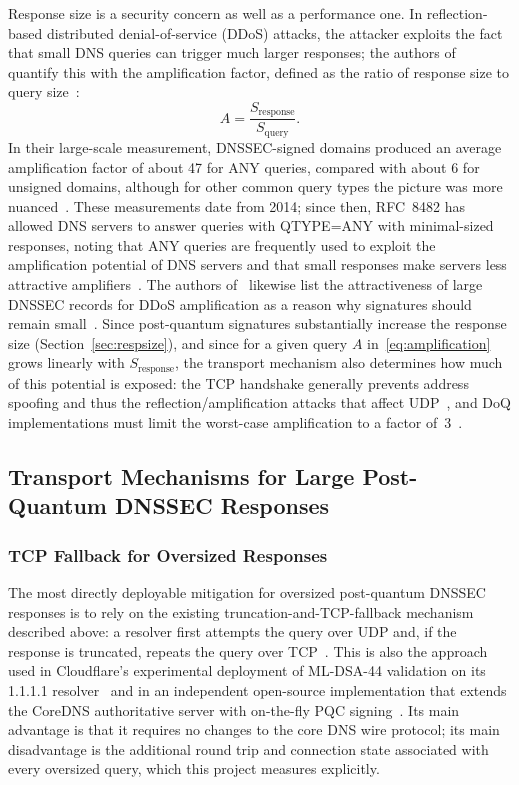 \documentclass[conference]{IEEEtran}
\begin{document}
Response size is a security concern as well as a performance one. In
reflection-based distributed denial-of-service (DDoS) attacks, the attacker
exploits the fact that small DNS queries can trigger much larger responses;
the authors of~\cite{dnssecddos} quantify this with the amplification factor,
defined as the ratio of response size to query size~\cite{dnssecddos}:
\begin{equation}
A = \frac{S_\text{response}}{S_\text{query}} .
\label{eq:amplification}
\end{equation}
In their large-scale measurement, DNSSEC-signed domains produced an average
amplification factor of about 47 for ANY queries, compared with about 6 for
unsigned domains, although for other common query types the picture was more
nuanced~\cite{dnssecddos}. These measurements date from 2014; since then,
RFC~8482 has allowed DNS servers to answer queries with QTYPE=ANY with
minimal-sized responses, noting that ANY queries are frequently used to
exploit the amplification potential of DNS servers and that small responses
make servers less attractive amplifiers~\cite{rfc8482}. The authors
of~\cite{retrofitting} likewise list the attractiveness of large DNSSEC records
for DDoS amplification as a reason why signatures should remain
small~\cite{retrofitting}. Since post-quantum signatures substantially increase
the response size (Section~\ref{sec:respsize}), and since for a given query $A$
in~\eqref{eq:amplification} grows linearly with $S_\text{response}$, the
transport mechanism also determines how much of this potential is exposed: the TCP handshake generally
prevents address spoofing and thus the reflection/amplification attacks that
affect UDP~\cite{rfc7766}, and DoQ implementations must limit the worst-case
amplification to a factor of~3~\cite{rfc9250}.

\subsection{Transport Mechanisms for Large Post-Quantum DNSSEC Responses}

\subsubsection{TCP Fallback for Oversized Responses}

The most directly deployable mitigation for oversized post-quantum DNSSEC
responses is to rely on the existing truncation-and-TCP-fallback mechanism
described above: a resolver first attempts the query over UDP and, if the
response is truncated, repeats the query over TCP~\cite{rfc6891,rfc7766}. This
is also the approach used in Cloudflare's experimental deployment of ML-DSA-44
validation on its 1.1.1.1 resolver~\cite{cloudflareblog} and in an independent
open-source implementation that extends the CoreDNS authoritative server with
on-the-fly PQC signing~\cite{corednspqc,coredns}. Its main advantage is that it
requires no changes to the core DNS wire protocol; its main disadvantage is the
additional round trip and connection state associated with every oversized
query, which this project measures explicitly.
\end{document}
